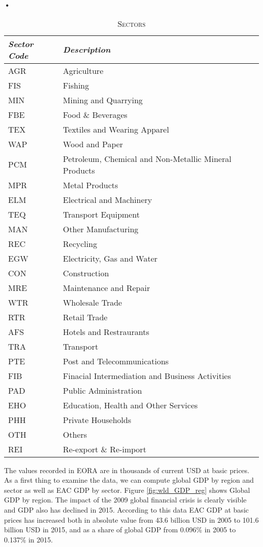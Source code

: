 \textbf{\textbf{•}}\documentclass[a4paper]{article}
\begin{document}
\begin{table}[h!]
\centering
\caption{\textsc{Sectors}}

\label{tab:sec}
\vspace{2mm}
\begin{tabular}{ll} \toprule
\textit{Sector Code} & \textit{Description} \\ \midrule
AGR & Agriculture \\
 FIS & Fishing \\
 MIN & Mining and Quarrying \\
 FBE & Food \& Beverages \\
 TEX & Textiles and Wearing Apparel \\
 WAP & Wood and Paper \\
 PCM & Petroleum, Chemical and Non-Metallic Mineral Products \\
 MPR & Metal Products \\
 ELM & Electrical and Machinery \\
 TEQ & Transport Equipment \\
 MAN & Other Manufacturing \\
 REC & Recycling \\
 EGW & Electricity, Gas and Water \\
 CON & Construction \\
 MRE & Maintenance and Repair \\
 WTR & Wholesale Trade \\
 RTR & Retail Trade \\
 AFS & Hotels and Restraurants \\
 TRA & Transport \\
 PTE & Post and Telecommunications \\
 FIB & Finacial Intermediation and Business Activities \\
 PAD & Public Administration \\
 EHO & Education, Health and Other Services \\
 PHH & Private Households \\
 OTH & Others \\
 REI & Re-export \& Re-import \\ \bottomrule
\end{tabular}
\end{table}
\FloatBarrier


The values recorded in EORA are in thousands of current USD at basic prices. As a first thing to examine the data, we can compute global GDP by region and sector as well as EAC GDP by sector. Figure \ref{fig:wld_GDP_reg} shows Global GDP by region. The impact of the 2009 global financial crisis is clearly visible and GDP also has declined in 2015. According to this data EAC GDP at basic prices has increased both in absolute value from 43.6 billion USD in 2005 to 101.6 billion USD in 2015, and as a share of global GDP from 0.096\% in 2005 to 0.137\% in 2015. \newline
\end{document}
